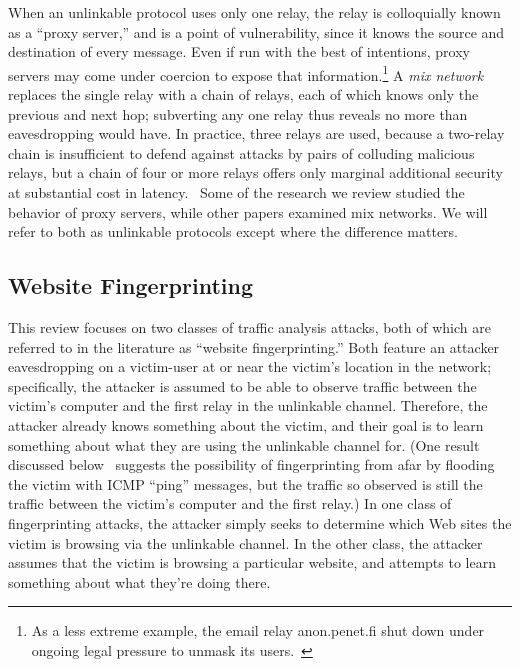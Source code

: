 \documentclass{zarticle}
\begin{document}
When an unlinkable protocol uses only one relay, the relay is
colloquially known as a “proxy server,” and is a point of
vulnerability, since it knows the source and destination of every
message.  Even if run with the best of intentions, proxy servers may
come under coercion to expose that information.\footnote{As a less
  extreme example, the email relay \textsf{anon.penet.fi} shut down
  under ongoing legal pressure to unmask its
  users.~\cite{newman1996church}} A \emph{mix
  network}~\cite{chaum1981mix} replaces the single relay with a chain
of relays, each of which knows only the previous and next hop;
subverting any one relay thus reveals no more than eavesdropping would
have.  In practice, three relays are used, because a two-relay chain
is insufficient to defend against attacks by pairs of colluding
malicious relays, but a chain of four or more relays offers only
marginal additional security at substantial cost in
latency.~\cite{wright2002analysis,wright2003defending}  Some of the
research we review studied the behavior of proxy servers, while other
papers examined mix networks.  We will refer to both as unlinkable
protocols except where the difference matters.

\subsection{Website Fingerprinting}

This review focuses on two classes of traffic analysis attacks, both
of which are referred to in the literature as “website
fingerprinting.”  Both feature an attacker eavesdropping on a
victim-user at or near the victim's location in the network;
specifically, the attacker is assumed to be able to observe traffic
between the victim's computer and the first relay in the unlinkable
channel.  Therefore, the attacker already knows something about the
victim, and their goal is to learn something about what they are using
the unlinkable channel for.  (One result discussed
below~\cite{gong2011remote} suggests the possibility of fingerprinting
from afar by flooding the victim with ICMP “ping” messages, but the
traffic so observed is still the traffic between the victim's computer
and the first relay.)  In one class of fingerprinting attacks, the
attacker simply seeks to determine which Web sites the victim is
browsing via the unlinkable channel.  In the other class, the attacker
assumes that the victim is browsing a particular website, and attempts
to learn something about what they're doing there.
\end{document}
